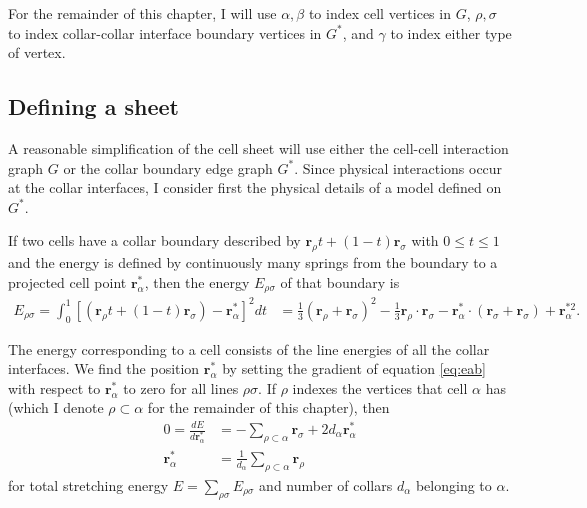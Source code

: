 For the remainder of this chapter, I will use $\alpha,\beta$ to index cell vertices in $G$, $\rho, \sigma$ to index collar-collar interface boundary vertices in $G^*$, and $\gamma$ to index either type of vertex.

\subsection{Defining a sheet} \label{subsec:springs}

A reasonable simplification of the cell sheet will use either the cell-cell interaction graph $G$ or the collar boundary edge graph $G^*$. 
Since physical interactions occur at the collar interfaces, I consider first the physical details of a model defined on $G^*$. 

If two cells have a collar boundary described by $\bm{r}_\rho t + (1-t)\bm{r}_\sigma$ with $0 \leq t \leq 1$ and the energy is defined by continuously many springs from the boundary to a projected cell point $\bm{r}^*_\alpha$, then the energy $E_{\rho\sigma}$ of that boundary is 
 \begin{align}
     E_{\rho\sigma} = \int_0^1 \left[(\bm{r}_\rho t + (1-t)\bm{r}_\sigma) - \bm{r}^*_\alpha \right]^2 dt &= \frac{1}{3} (\bm{r}_\rho + \bm{r}_\sigma)^2 - \frac{1}{3} \bm{r}_\rho\cdot\bm{r}_\sigma - \bm{r}^*_\alpha \cdot (\bm{r}_\sigma + \bm{r}_\sigma) + \bm{r}^{*2}_\alpha. \label{eq:eab}
 \end{align}

The energy corresponding to a cell consists of the line energies of all the collar interfaces. 
We find the position $\bm{r}^*_\alpha$ by setting the gradient of equation \ref{eq:eab} with respect to $\bm{r}^*_\alpha$ to zero for all lines $\rho\sigma$. 
If $\rho$ indexes the vertices that cell $\alpha$ has (which I denote $\rho\subset\alpha$ for the remainder of this chapter), then 
\begin{align*}
    0 = \frac{dE}{d\bm{r}^*_\alpha} &= -\sum_{\rho\subset\alpha} \bm{r}_\sigma + 2d_\alpha\bm{r}^*_\alpha \\
    \bm{r}^*_\alpha &= \frac{1}{d_\alpha} \sum_{\rho\subset\alpha} \bm{r}_\rho
\end{align*}
\noindent for total stretching energy $E = \sum_{\rho\sigma}E_{\rho\sigma}$ and number of collars $d_\alpha$ belonging to $\alpha$.

